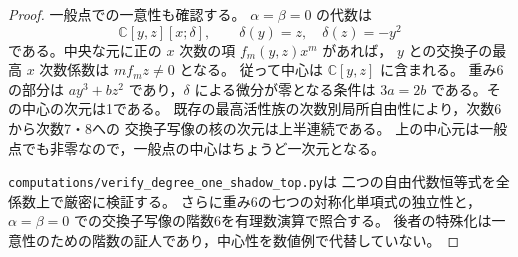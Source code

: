 \begin{proof}
一般点での一意性も確認する。
$\alpha=\beta=0$ の代数は
\[
 \mathbb C[y,z][x;\delta],\qquad
             \delta(y)=z,\quad\delta(z)=-y^2
\]
である。中央な元に正の $x$ 次数の項 $f_m(y,z)x^m$ があれば，
$y$ との交換子の最高 $x$ 次数係数は $m f_mz\ne0$ となる。
従って中心は $\mathbb C[y,z]$ に含まれる。
重み6の部分は $ay^3+bz^2$ であり，$\delta$ による微分が零となる条件は
$3a=2b$ である。その中心の次元は1である。
既存の最高活性族の次数別局所自由性により，次数6から次数7・8への
交換子写像の核の次元は上半連続である。
上の中心元は一般点でも非零なので，一般点の中心はちょうど一次元となる。

\texttt{computations/verify\_degree\_one\_shadow\_top.py}は
二つの自由代数恒等式を全係数上で厳密に検証する。
さらに重み6の七つの対称化単項式の独立性と，
$\alpha=\beta=0$ での交換子写像の階数6を有理数演算で照合する。
後者の特殊化は一意性のための階数の証人であり，中心性を数値例で代替していない。
\end{proof}


